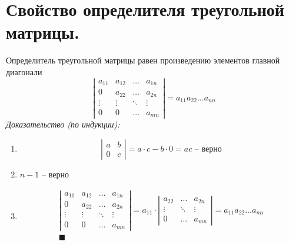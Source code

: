 \documentclass[12pt, fleqn]{article}
\begin{document}
\section{Свойство определителя треугольной матрицы.}
Определитель треугольной матрицы равен произведению элементов главной диагонали
$$\left|
\begin{array}{cccc}
	a_{11} & a_{12} & \ldots & a_{1n}\\
	0 & a_{22} & \ldots & a_{2n}\\
	\vdots & \vdots & \ddots & \vdots\\
	0 & 0 & \ldots & a_{mn}
\end{array}
\right| = a_{11}a_{22}\dots a_{nn}$$
\textit{Доказательство (по индукции):}
	\begin{enumerate}[1)]
	\item 
	\begin{equation*}
		\left|
		\begin{array}{cc}
			a&b\\
			0&c
		\end{array}
		\right|=a\cdot c-b\cdot0 = ac \text{ -- верно}
	\end{equation*}
	\item $n-1$ -- верно
	\item 
	\begin{multline*}
		\left|
		\begin{array}{cccc}
			a_{11} & a_{12} & \ldots & a_{1n}\\
			0 & a_{22} & \ldots & a_{2n}\\
			\vdots & \vdots & \ddots & \vdots\\
			0 & 0 & \ldots & a_{mn}
		\end{array}
		\right| = a_{11}\cdot \left|
		\begin{array}{ccc}
			a_{22} & \ldots & a_{2n}\\
			\vdots & \ddots & \vdots\\
			0 & \ldots & a_{mn}
		\end{array}
		\right| = a_{11}a_{22}\dots a_{nn}\\
		\blacksquare\\
	\end{multline*}
\end{enumerate}
\end{document}
